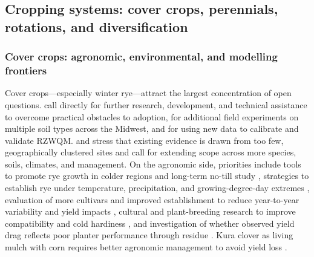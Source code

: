 \documentclass[11pt]{article}
\begin{document}
\subsection{Cropping systems: cover crops, perennials, rotations, and diversification}

\subsubsection{Cover crops: agronomic, environmental, and modelling frontiers}

Cover crops---especially winter rye---attract the largest concentration of open questions. \textcite{Kladivko2014} call directly for further research, development, and technical assistance to overcome practical obstacles to adoption, for additional field experiments on multiple soil types across the Midwest, and for using new data to calibrate and validate RZWQM. \textcite{Birru2023} and \textcite{Zhao2016} stress that existing evidence is drawn from too few, geographically clustered sites and call for extending scope across more species, soils, climates, and management. On the agronomic side, priorities include tools to promote rye growth in colder regions and long-term no-till study \parencite{Waring2020}, strategies to establish rye under temperature, precipitation, and growing-degree-day extremes \parencite{Bawa2023}, evaluation of more cultivars and improved establishment to reduce year-to-year variability and yield impacts \parencite{Kaspar2007}, cultural and plant-breeding research to improve compatibility and cold hardiness \parencite{Dinnes2002,Liu2019}, and investigation of whether observed yield drag reflects poor planter performance through residue \parencite{Dougherty2020}. Kura clover as living mulch with corn requires better agronomic management to avoid yield loss \parencite{Qi2011b,Qi2011}.
\end{document}
